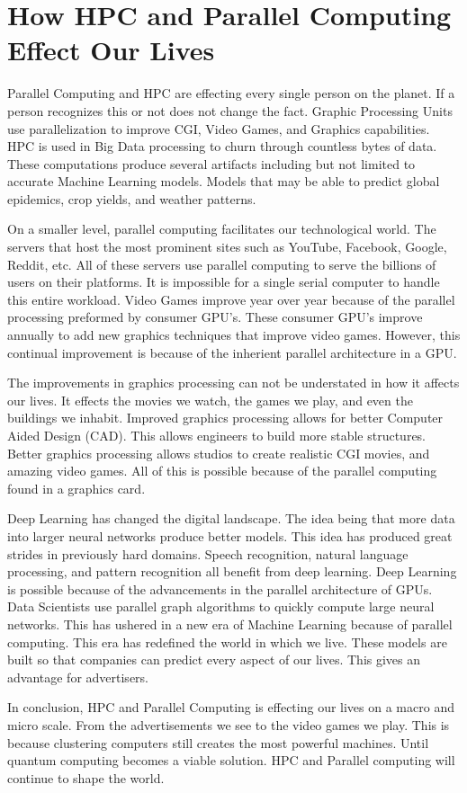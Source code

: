 \setlength{\parindent}{10ex}


\section{How HPC and Parallel Computing Effect Our Lives}
Parallel Computing and HPC are effecting every single person on the planet.
If a person recognizes this or not does not change the fact. 
Graphic Processing Units use parallelization to improve CGI, Video Games, and Graphics capabilities.
HPC is used in Big Data processing to churn through countless bytes of data.
These computations produce several artifacts including but not limited to accurate Machine Learning models.
Models that may be able to predict global epidemics, crop yields, and weather patterns.

\par
On a smaller level, parallel computing facilitates our technological world. 
The servers that host the most prominent sites such as YouTube, Facebook, Google, Reddit, etc.
All of these servers use parallel computing to serve the billions of users on their platforms.
It is impossible for a single serial computer to handle this entire workload. 
Video Games improve year over year because of the parallel processing preformed by consumer GPU's.
These consumer GPU's improve annually to add new graphics techniques that improve video games.
However, this continual improvement is because of the inherient parallel architecture in a GPU.

\par
The improvements in graphics processing can not be understated in how it affects our lives.
It effects the movies we watch, the games we play, and even the buildings we inhabit.
Improved graphics processing allows for better Computer Aided Design (CAD).
This allows engineers to build more stable structures.
Better graphics processing allows studios to create realistic CGI movies, and amazing video games.
All of this is possible because of the parallel computing found in a graphics card.

\par
Deep Learning has changed the digital landscape. 
The idea being that more data into larger neural networks produce better models.
This idea has produced great strides in previously hard domains.
Speech recognition, natural language processing, and pattern recognition all benefit from deep learning.
Deep Learning is possible because of the advancements in the parallel architecture of GPUs.
Data Scientists use parallel graph algorithms to quickly compute large neural networks.
This has ushered in a new era of Machine Learning because of parallel computing.
This era has redefined the world in which we live.
These models are built so that companies can predict every aspect of our lives.
This gives an advantage for advertisers.

\par 
In conclusion, HPC and Parallel Computing is effecting our lives on a macro and micro scale. 
From the advertisements we see to the video games we play. 
This is because clustering computers still creates the most powerful machines.
Until quantum computing becomes a viable solution.
HPC and Parallel computing will continue to shape the world.
